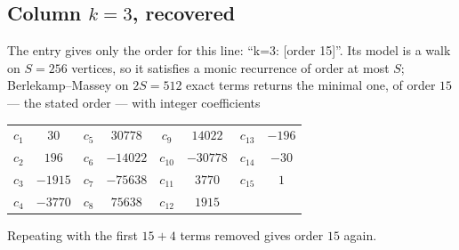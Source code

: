 \documentclass[11pt,a4paper]{article}
\theoremstyle{plain}
\theoremstyle{definition}
\begin{document}
\subsection*{Column $k=3$, recovered}
The entry gives only the order for this line: ``k=3: [order 15]''. Its model is a walk on
$S=256$ vertices, so it satisfies a monic recurrence of order at most $S$;
Berlekamp--Massey on $2S=512$ exact terms returns the minimal one, of order
$15$ --- the stated order --- with integer coefficients
\begin{center}\small\begin{tabular}{cccccccc}
$c_{1}$ & $30$ & $c_{5}$ & $30778$ & $c_{9}$ & $14022$ & $c_{13}$ & $-196$ \\
$c_{2}$ & $196$ & $c_{6}$ & $-14022$ & $c_{10}$ & $-30778$ & $c_{14}$ & $-30$ \\
$c_{3}$ & $-1915$ & $c_{7}$ & $-75638$ & $c_{11}$ & $3770$ & $c_{15}$ & $1$ \\
$c_{4}$ & $-3770$ & $c_{8}$ & $75638$ & $c_{12}$ & $1915$ &  &  \\
\end{tabular}\end{center}
Repeating with the first $15+4$ terms removed gives order $15$ again.
\end{document}
